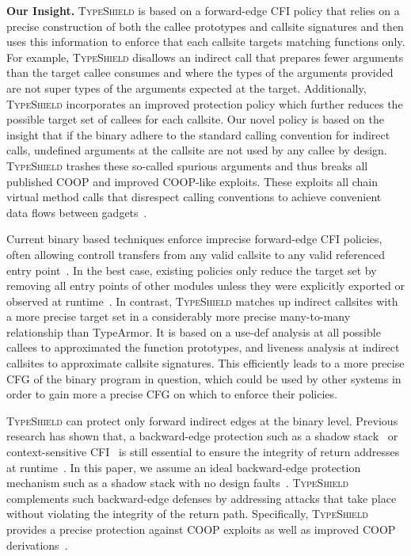 \textbf{Our Insight.} \textsc{TypeShield} is based on a forward-edge CFI policy that 
relies on a precise construction of both the callee prototypes and callsite signatures
and then uses this information to enforce that each callsite targets matching functions 
only. For example, \textsc{TypeShield} disallows an indirect call that prepares
fewer arguments than the target callee consumes and where the types of the 
arguments provided are not super types of the arguments expected at the target.
Additionally, \textsc{TypeShield} incorporates an improved protection policy
which further reduces the possible target set of callees for each callsite.
Our novel policy is based on the insight that if the binary adhere to the standard calling convention
for indirect calls, undefined arguments at the callsite are not used by
any callee by design. \textsc{TypeShield} trashes these so-called
spurious arguments and thus breaks all published COOP
and improved COOP-like exploits. These exploits all chain
virtual method calls that disrespect calling conventions to
achieve convenient data flows between gadgets~\cite{crane:readactor++}.

Current binary based techniques enforce imprecise forward-edge CFI 
policies, often allowing controll transfers from any valid callsite 
to any valid referenced entry point~\cite{ccfir:zhang, zhang:usenix}. 
In the best case, existing policies only reduce the target set by
removing all entry points of other modules unless they were
explicitly exported or observed at runtime~\cite{payer:dimva}. 
In contrast, \textsc{TypeShield} matches up indirect callsites with a more precise
target set in a considerably more precise many-to-many relationship than TypeArmor.
It is based on a use-def analysis at all possible callees to approximated the function prototypes, 
and liveness analysis at indirect callsites to approximate callsite signatures. This 
efficiently leads to a more precise CFG of the binary program in question, 
which could be used by other systems in order to gain more a precise CFG on which to 
enforce their policies.

\textsc{TypeShield} can protect only forward indirect edges at the binary level.
Previous research has shown that, a backward-edge protection 
such as a shadow stack~\cite{dang:asiaccs} or context-sensitive
CFI~\cite{veen:cfi} is still essential to ensure the integrity of return addresses at 
runtime~\cite{crane:readactor++}. In this paper, we assume an ideal
backward-edge protection mechanism such as a shadow
stack with no design faults~\cite{conti:ccs}. 
\textsc{TypeShield} complements such backward-edge defenses by addressing
attacks that take place without violating the integrity of the return path.
Specifically, \textsc{TypeShield} provides a precise protection 
against COOP exploits as well as improved COOP 
derivations~\cite{crane:readactor++, subversive-c:lettner, ctf:coop, loop:oriented}.

